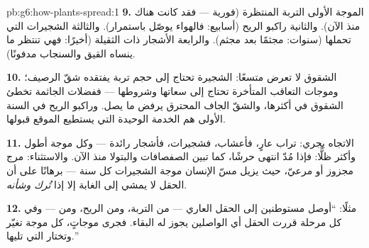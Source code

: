 \begin{solution}{pb:g6:how-plants-spread:1}
\textbf{9.} الموجة الأولى  التربة المنتظرة (فورية --- فقد
كانت هناك منذ الآن). والثانية راكبو الريح (أسابيع: فالهواء يوصّل
باستمرار). والثالثة الشجيرات التي تحملها  (سنوات: مجثمًا
بعد مجثم). والرابعة الأشجار ذات  الثقيلة (أخيرًا: فهي تنتظر
ما ينساه القيق والسنجاب مدفونًا).

\textbf{10.} الشقوق لا تعرض متسعًا:  الشجيرة تحتاج إلى حجم
تربة يفتقده شقّ الرصيف؛ وموجات التعاقب المتأخرة تحتاج إلى سعاتها
وشروطها --- ففضلات  الجاثمة تخطئ الشقوق في أكثرها، والشقّ
الجاف المحترق يرفض ما يصل. وراكبو الريح في السنة الأولى هم الخدمة
الوحيدة التي يستطيع الموقع قبولها.

\textbf{11.} الاتجاه يجري: تراب عارٍ، فأعشاب، فشجيرات، فأشجار
رائدة --- وكل موجة أطول وأكثر ظلًّا: فإذا مُدّ انتهى حرشًا، كما
تبين الصفصافات والبتولا منذ الآن. والاستثناء: مرج مجزوز أو مرعيّ،
حيث يزيل مسّ الإنسان موجة الشجيرات كل سنة --- برهانًا على أن الحقل
لا يمشي إلى الغابة إلا إذا \emph{تُرك وشأنه}.

\textbf{12.} مثلًا: ``أوصل  مستوطنين إلى الحقل العاري ---
من التربة، ومن الريح، ومن  --- وفي كل مرحلة قررت  الحقل
أي الواصلين يجوز له البقاء. فجرى  موجاتٍ، كل موجة تغيّر
 وتختار التي تليها.''
\end{solution}
